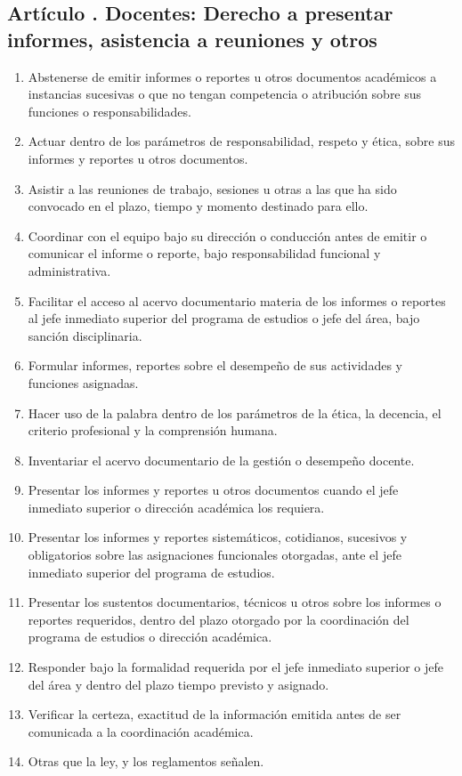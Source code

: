 \subsection{Artículo . Docentes: Derecho a presentar informes, asistencia a reuniones y otros}
\addtocounter{ns}{1}
\begin{enumerate}
\item Abstenerse de emitir informes o reportes u otros documentos académicos a instancias sucesivas o que no tengan competencia o atribución sobre sus funciones o responsabilidades. 
\item Actuar dentro de los parámetros de responsabilidad, respeto y ética, sobre sus informes y reportes u otros documentos. 
\item Asistir a las reuniones de trabajo, sesiones u otras a las que ha sido convocado en el plazo, tiempo y momento destinado para ello. 
\item Coordinar con el equipo bajo su dirección o conducción antes de emitir o comunicar el informe o reporte, bajo responsabilidad funcional y administrativa. 
\item Facilitar el acceso al acervo documentario materia de los informes o reportes al jefe inmediato superior del programa de estudios o jefe del área, bajo sanción disciplinaria. 
\item Formular informes, reportes sobre el desempeño de sus actividades y funciones asignadas. 
\item Hacer uso de la palabra dentro de los parámetros de la ética, la decencia, el criterio profesional y la comprensión humana. 
\item Inventariar el acervo documentario de la gestión o desempeño docente. 
\item Presentar los informes y reportes u otros documentos cuando el jefe inmediato superior o dirección académica los requiera. 
\item Presentar los informes y reportes sistemáticos, cotidianos, sucesivos y obligatorios sobre las asignaciones funcionales otorgadas, ante el jefe inmediato superior del programa de estudios.  
\item Presentar los sustentos documentarios, técnicos u otros sobre los informes o reportes requeridos, dentro del plazo otorgado por la coordinación del programa de estudios o dirección académica. 
\item Responder bajo la formalidad requerida por el jefe inmediato superior o jefe del área y dentro del plazo tiempo previsto y asignado. 
\item Verificar la certeza, exactitud de la información emitida antes de ser comunicada a la coordinación académica. 
\item Otras que la ley, y los reglamentos señalen.
\end{enumerate}

